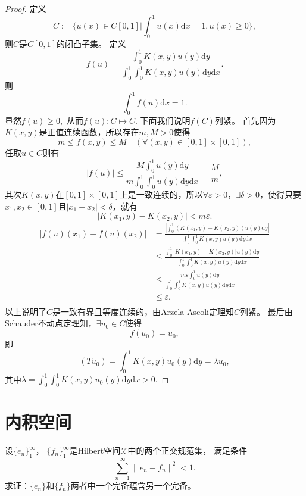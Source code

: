\begin{proof}
定义
$$C:=\{u(x)\in C[0,1]|\int_0^1u(x)\mathrm{d}x=1,u(x)\geq0\},$$
则$C$是$C[0,1]$的闭凸子集。
定义
$$f(u)=\frac{\int_0^1K(x,y)u(y)\mathrm{d}y}{\int_0^1\int_0^1K(x,y)u(y)\mathrm{d}y\mathrm{d}x}.$$
则$$\int_0^1f(u)\mathrm{d}x=1.$$显然$f(u)\geq0,$
从而$f(u):C\mapsto C.$
下面我们说明$f(C)$列紧。
首先因为$K(x,y)$是正值连续函数，所以存在$m,M>0$使得
$$m\leq f(x,y)\leq M\quad(\forall(x,y)\in[0,1]\times[0,1]),$$
任取$u\in C$则有
$$|f(u)|\leq\frac{M\int_0^1u(y)\mathrm{d}y}{m\int_0^1\int_0^1u(y)\mathrm{d}y\mathrm{d}x}=\frac{M}{m},$$
其次$K(x,y)$在$[0,1]\times[0,1]$上是一致连续的，所以$\forall\varepsilon>0$，$\exists\delta>0$，使得只要$x_1,x_2\in[0,1]$且$|x_1-x_2|<\delta$，就有$$|K(x_1,y)-K(x_2,y)|<m\varepsilon.$$
\begin{align*}
|f(u)(x_1)-f(u)(x_2)|&=\frac{|\int_0^1(K(x_1,y)-K(x_2,y))u(y)\mathrm{d}y|}{\int_0^1\int_0^1K(x,y)u(y)\mathrm{d}y\mathrm{d}x}\\
&\leq\frac{\int_0^1|K(x_1,y)-K(x_2,y)|u(y)\mathrm{d}y}{\int_0^1\int_0^1K(x,y)u(y)\mathrm{d}y\mathrm{d}x}\\
&\leq\frac{m\varepsilon\int_0^1u(y)\mathrm{d}y}{\int_0^1\int_0^1K(x,y)u(y)\mathrm{d}y\mathrm{d}x}\\
&\leq\varepsilon.\\
\end{align*}
以上说明了$C$是一致有界且等度连续的，由Arzela-Ascoli定理知$C$列紧。
最后由Schauder不动点定理知，$\exists u_0\in C$使得$$f(u_0)=u_0,$$
即
$$(Tu_0)=\int_0^1K(x,y)u_0(y)\mathrm{d}y=\lambda u_0,$$其中$\lambda=\int_0^1\int_0^1K(x,y)u_0(y)\mathrm{d}y\mathrm{d}x>0.$
\end{proof}

\section{内积空间}


\begin{exercise}
设$\{e_n\}_1^{\infty}$，
$\{f_n\}_1^{\infty}$是Hilbert空间$\mathscr{X}$中的两个正交规范集，
满足条件
\begin{equation}
\sum_{n=1}^{\infty}\|e_n-f_n\|^2<1.
\end{equation}
求证：$\{e_n\}$和$\{f_n\}$两者中一个完备蕴含另一个完备。
\end{exercise}

